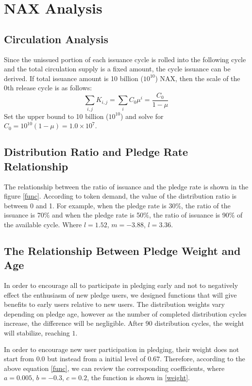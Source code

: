 \section{NAX Analysis}
\subsection{Circulation Analysis}
Since the unissued portion of each issuance cycle is rolled into the following cycle and the total circulation supply is a fixed amount, the cycle issuance can be derived. If total issuance amount is 10 billion (\(10^{10}\)) NAX, then the scale of the 0th release cycle is as follows:
\begin{equation}
  \sum_{i,j} K_{i,j} = \sum_i C_0 \mu^i = \frac{C_0}{1-\mu}
\end{equation}
  Set the upper bound to 10 billion (\(10^{10}\)) and solve for \(C_0 = 10^{10}(1-\mu) = 1.0\times10^7\).

\subsection{Distribution Ratio and Pledge Rate Relationship}
The relationship between the ratio of issuance and the pledge rate is shown in the figure \ref{func}. According to token demand, the value of the distribution ratio is between 0 and 1. For example, when the pledge rate is 30\%, the ratio of the issuance is 70\% and when the pledge rate is 50\%, the ratio of issuance is 90\% of the available cycle. Where \(l=1.52\), \(m=-3.88\), \(l=3.36\).

\subsection{The Relationship Between Pledge Weight and Age}
In order to encourage all to participate in pledging early and not to negatively effect the enthusiasm of new pledge users, we designed functions that will give benefits to early users relative to new users. The distribution weights vary depending on pledge age, however as the number of completed distribution cycles increase, the difference will be negligible. After 90 distribution cycles, the weight will stabilize, reaching $1$. 

In order to encourage new user participation in pledging, their weight does not start from 0.0 but instead from a initial level of $0.67$. Therefore, according to the above equation \ref{func}, we can review the corresponding coefficients, where \(a=0.005\), \(b=-0.3\), \(c=0.2\), the function is shown in \ref{weight}. 

